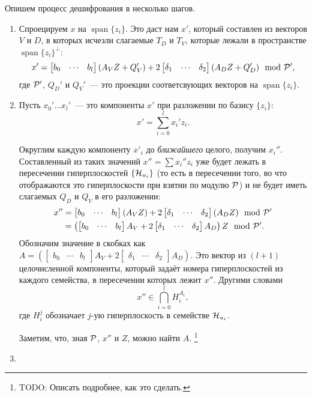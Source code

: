 \documentclass[oneside, a4paper]{article}
\theoremstyle{plain}
\theoremstyle{definition}
\theoremstyle{remark}
\DeclareMathOperator{\Span}{span}
\newcommand\PP{\ensuremath \mathcal P}
\newcommand\HH{\ensuremath \operatorname{\mathcal H}}
\begin{document}
Опишем процесс дешифрования в несколько шагов.
\begin{enumerate}

  \item Спроецируем $x$ на $\Span \{z_i\}$. Это даст нам $x'$, который составлен
  из векторов $V$ и $D$, в которых исчезли слагаемые $T_D$ и $T_V$, которые
  лежали в пространстве $\Span \{z_i\}^\bot$:
  \[
  x' = \begin{bmatrix} b_0 & \cdots & b_l \end{bmatrix} (A_V Z + Q_V')
     + 2 \begin{bmatrix} \delta_1 & \cdots & \delta_2 \end{bmatrix}
        (A_D Z + Q_D')
     \mod \PP',
  \]
  где $\PP'$, $Q_D'$ и $Q_V'$~--- это проекции соответсвующих векторов на
  $\Span\{z_i\}$.

  \item Пусть $x_0' \dots x_l'$~--- это компоненты $x'$ при разложении по базису
  $\{z_i\}$:
  \[
  x' = \sum_{i = 0}^l x_i' z_i.
  \]
  
  Округлим каждую компоненту $x'_i$ до \emph{ближайшего} целого, получим
  $x_i''$. Составленный из таких значений $x'' = \sum x_i'' z_i$ уже будет
  лежать в пересечении гиперплоскостей $\{\HH_{u_i}\}$ (то есть в пересечении
  того, во что отображаются это гиперплоскости при взятии по модулю $\PP$) и не
  будет иметь слагаемых $Q_D$ и $Q_V$ в его разложении:
  \[
  \begin{aligned}
    x'' &= \begin{bmatrix} b_0 & \cdots & b_l \end{bmatrix} (A_V Z)
        + 2 \begin{bmatrix} \delta_1 & \cdots & \delta_2 \end{bmatrix}
          (A_D Z)
        \mod \PP' \\
        &= \left (\begin{bmatrix} b_0 & \cdots & b_l \end{bmatrix} A_V
         + 2 \begin{bmatrix} \delta_1 & \cdots & \delta_2 \end{bmatrix} A_D
         \right) Z
         \mod \PP'.
  \end{aligned}
  \]
  Обозначим значение в скобках как $A = (\begin{bmatrix} b_0 & \cdots &
  b_l \end{bmatrix} A_V + 2 \begin{bmatrix} \delta_1 & \cdots & \delta_2
  \end{bmatrix} A_D)$. Это вектор из $(l+1)$ целочисленной компоненты, который
  задаёт номера гиперплоскостей из каждого семейства, в пересечении которых
  лежит $x''$. Другими словами
  \[
    x'' \in \bigcap_{i = 0}^l H_i^{A_i},
  \]
  где $H_i^j$ обозначает $j$-ую гиперплоскость в семействе $\HH_{u_i}$.

  Заметим, что, зная $\PP$, $x''$ и $Z$, можно найти $A$. \footnote{TODO:
  Описать подробнее, как это сделать.}

  \item

\end{enumerate}
\end{document}
